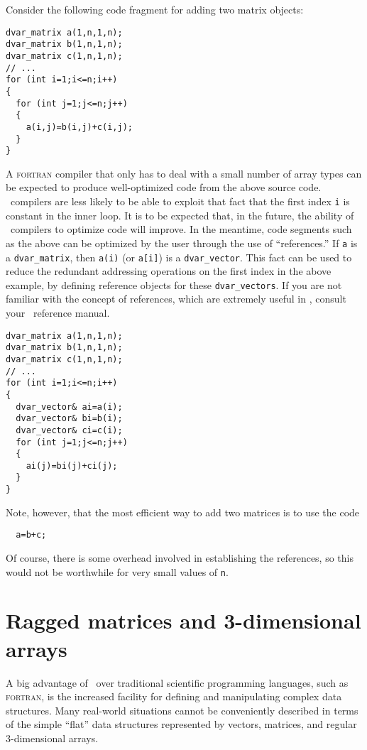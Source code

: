 \documentclass{admbmanual}
\begin{document}
Consider the following code fragment for adding two matrix objects:
\begin{lstlisting}
dvar_matrix a(1,n,1,n);
dvar_matrix b(1,n,1,n);
dvar_matrix c(1,n,1,n);
// ...
for (int i=1;i<=n;i++)
{
  for (int j=1;j<=n;j++)
  {
    a(i,j)=b(i,j)+c(i,j);
  }
}
\end{lstlisting}

A \textsc{fortran} compiler that only has to deal with a small number of
array types can be expected to produce well-optimized code
from the above source code. \cplus\ compilers are less likely
to be able to exploit that fact that the first index \texttt{i} is constant 
in the inner loop. It is to be expected that, in the future,
the ability of \cplus\ compilers to optimize code will improve.
In the meantime, code segments such as the above can be
optimized by the user through the use of ``references.''
If \texttt{a} is a \texttt{dvar\_matrix}, then \texttt{a(i)} 
(or \texttt{a[i]}) is a \texttt{dvar\_vector}. This fact can be used 
to reduce the redundant addressing operations on the first index
in the above example, by defining reference objects for these
\texttt{dvar\_vectors}. If you are not familiar with the
concept of references, which are extremely useful in 
\cplus, consult your \cplus\ reference manual.
\begin{lstlisting}
dvar_matrix a(1,n,1,n);
dvar_matrix b(1,n,1,n);
dvar_matrix c(1,n,1,n);
// ...
for (int i=1;i<=n;i++)
{
  dvar_vector& ai=a(i);
  dvar_vector& bi=b(i);
  dvar_vector& ci=c(i);
  for (int j=1;j<=n;j++)
  {
    ai(j)=bi(j)+ci(j);
  }
}
\end{lstlisting}
Note, however, that the most efficient way to add two matrices
is to use the code
\begin{lstlisting}
  a=b+c;
\end{lstlisting}

Of course, there is some overhead involved in establishing the references,
so this would not be worthwhile for very small values of \texttt{n}.


\section{Ragged matrices and 3-dimensional arrays}

A big advantage of \cplus\ over traditional scientific 
programming languages, such as \textsc{fortran}, is the increased
facility for defining and manipulating complex data structures.
Many real-world situations cannot be conveniently described in 
terms of the simple ``flat'' data structures represented by
vectors, matrices, and regular 3-dimensional arrays.
\end{document}
